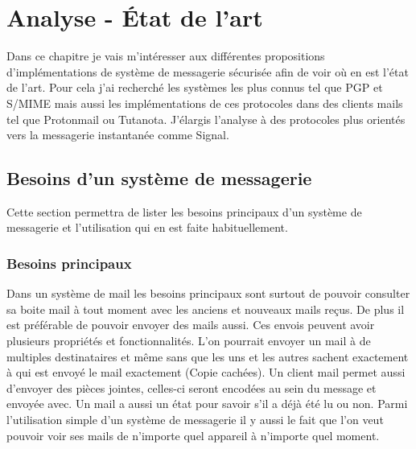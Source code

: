 \chapter{Analyse - État de l'art}
\label{ch:analysis}
Dans ce chapitre je vais m'intéresser aux différentes propositions d'implémentations de système de messagerie sécurisée afin de voir où en est l'état de l'art. Pour cela j'ai recherché les systèmes les plus connus tel que PGP et S/MIME mais aussi les implémentations de ces protocoles dans des clients mails tel que Protonmail ou Tutanota. J'élargis l'analyse à des protocoles plus orientés vers la messagerie instantanée comme Signal.
\section{Besoins d'un système de messagerie}
Cette section permettra de lister les besoins principaux d'un système de messagerie et l'utilisation qui en est faite habituellement.
\subsection{Besoins principaux}
Dans un système de mail les besoins principaux sont surtout de pouvoir consulter sa boite mail à tout moment avec les anciens et nouveaux mails reçus. De plus il est préférable de pouvoir envoyer des mails aussi. Ces envois peuvent avoir plusieurs propriétés et fonctionnalités. L'on pourrait envoyer un mail à de multiples destinataires et même sans que les uns et les autres sachent exactement à qui est envoyé le mail exactement (Copie cachées). Un client mail permet aussi d'envoyer des pièces jointes, celles-ci seront encodées au sein du message et envoyée avec. Un mail a aussi un état pour savoir s'il a déjà été lu ou non. Parmi l'utilisation simple d'un système de messagerie il y aussi le fait que l'on veut pouvoir voir ses mails de n'importe quel appareil à n'importe quel moment. 
